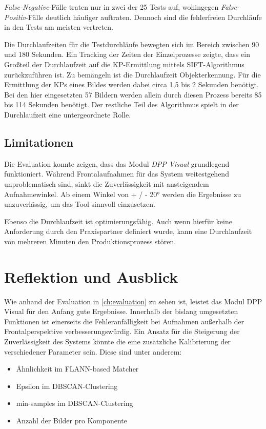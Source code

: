 \documentclass[
    type=Prakikumsbericht,
    status=draft, %
    language=german, %
    bibengine=bibtex,
]{unibwm-inf-thesis}
\begin{document}
    \textit{False-Negative}-Fälle traten nur in zwei der 25 Tests auf, wohingegen \textit{False-Positiv}-Fälle deutlich häufiger auftraten.
    Dennoch sind die fehlerfreien Durchläufe in den Tests am meisten vertreten.

    Die Durchlaufzeiten für die Testdurchläufe bewegten sich im Bereich zwischen 90 und 180 Sekunden.
    Ein Tracking der Zeiten der Einzelprozesse zeigte, dass ein Großteil der Durchlaufzeit auf die \ac{KP}-Ermittlung mittels \ac{SIFT}-Algorithmus zurückzuführen ist.
    Zu bemängeln ist die Durchlaufzeit Objekterkennung.
    Für die Ermittlung der \acp{KP} eines Bildes werden dabei circa 1,5 bis 2 Sekunden benötigt.
    Bei den hier eingesetzten 57 Bildern werden allein durch diesen Prozess bereits 85 bis 114 Sekunden benötigt.
    Der restliche Teil des Algorithmus spielt in der Durchlaufzeit eine untergeordnete Rolle.

    \section{Limitationen}
    Die Evaluation konnte zeigen, dass das Modul \textit{DPP Visual} grundlegend funktioniert.
    Während Frontalaufnahmen für das System weitestgehend unproblematisch sind, sinkt die Zuverlässigkeit mit ansteigendem Aufnahmewinkel.
    Ab einem Winkel von + / - 20° werden die Ergebnisse zu unzuverlässig, um das Tool sinnvoll einzusetzen.

    Ebenso die Durchlaufzeit ist optimierungsfähig.
    Auch wenn hierfür keine Anforderung durch den Praxispartner definiert wurde, kann eine Durchlaufzeit von mehreren Minuten den Produktionsprozess stören.

    \chapter{Reflektion und Ausblick}
    Wie anhand der Evaluation in \autoref{ch:evaluation} zu sehen ist, leistet das Modul \ac{DPP} Visual für den Anfang gute Ergebnisse.
    Innerhalb der bislang umgesetzten Funktionen ist einerseits die Fehleranfälligkeit bei Aufnahmen außerhalb der Frontalperspektive verbesserungswürdig.
    Ein Ansatz für die Steigerung der Zuverlässigkeit des Systems könnte die eine zusätzliche Kalibrierung der verschiedener Parameter sein.
    Diese sind unter anderem:
    \begin{itemize}
        \item Ähnlichkeit im \ac{FLANN}-based Matcher
        \item Epsilon im \ac{DBSCAN}-Clustering
        \item min-samples im \ac{DBSCAN}-Clustering
        \item Anzahl der Bilder pro Komponente
    \end{itemize}
\end{document}
